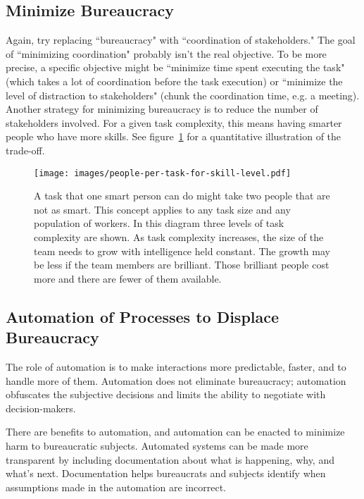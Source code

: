 \subsection*{Minimize Bureaucracy}
Again, try replacing ``bureaucracy" with ``coordination of stakeholders." The goal of ``minimizing coordination" probably isn't the real objective. To be more precise, a specific objective might be ``minimize time spent executing the task" (which takes a lot of coordination before the task execution) or ``minimize the level of distraction to stakeholders" (chunk the coordination time, e.g. a meeting). Another strategy for minimizing bureaucracy is to reduce the number of stakeholders involved. For a given task complexity, this means having smarter people who have more skills. See figure~\ref{fig:complexity-and-size} for a quantitative illustration of the trade-off. 


\begin{figure}
\centering
\texttt{[image: images/people-per-task-for-skill-level.pdf]}
\caption{A task that one smart person can do might take two  people that are not as smart. This concept applies to any task size and any population of workers. In this diagram three levels of task complexity are shown. As task complexity increases, the size of the team needs to grow with intelligence held constant. The growth may be less if the team members are brilliant. Those brilliant people cost more and there are fewer of them available.}
\label{fig:complexity-and-size}
\end{figure}


\subsection*{Automation of Processes to Displace Bureaucracy\label{sec:automation}}

The role of automation is to make interactions more predictable, faster, and to handle more of them. Automation does not eliminate bureaucracy; automation obfuscates the subjective decisions and limits the ability to negotiate with decision-makers.

There are benefits to automation, and automation can be enacted to minimize harm to bureaucratic subjects.  Automated systems can be made more transparent by including documentation about what is happening, why, and what's next.
Documentation helps  bureaucrats and subjects identify when assumptions made in the automation are incorrect. 


